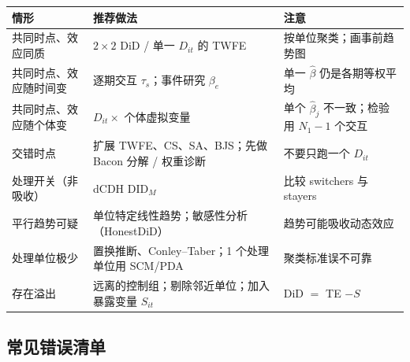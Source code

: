 \begin{center}
\small
\begin{tabularx}{\linewidth}{lLL}
\toprule
情形 & 推荐做法 & 注意\\
\midrule
共同时点、效应同质 & $2\times2$ DiD / 单一 $D_{it}$ 的 TWFE & 按单位聚类；画事前趋势图\\
共同时点、效应随时间变 & 逐期交互 $\tau_s$；事件研究 $\beta_e$ & 单一 $\hat\beta$ 仍是各期等权平均\\
共同时点、效应随个体变 & $D_{it}\times$ 个体虚拟变量 & 单个 $\hat\beta_j$ 不一致；检验用 $N_1-1$ 个交互\\
交错时点 & 扩展 TWFE、CS、SA、BJS；先做 Bacon 分解 / 权重诊断 & 不要只跑一个 $D_{it}$\\
处理开关（非吸收） & dCDH $\mathrm{DID}_M$ & 比较 switchers 与 stayers\\
平行趋势可疑 & 单位特定线性趋势；敏感性分析（HonestDiD） & 趋势可能吸收动态效应\\
处理单位极少 & 置换推断、Conley--Taber；1 个处理单位用 SCM/PDA & 聚类标准误不可靠\\
存在溢出 & 远离的控制组；剔除邻近单位；加入暴露变量 $S_{it}$ & DiD $=$ TE $-S$\\
\bottomrule
\end{tabularx}
\end{center}

\subsection{常见错误清单}

